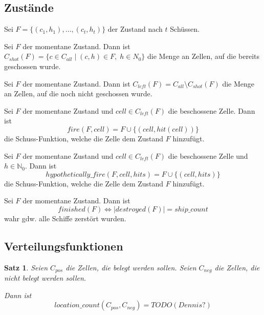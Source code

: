 \documentclass[a4paper,12pt]{llncs}
\newcommand{\N}{{\mathbb{N}}}
\numberwithin{equation}{section}
\newtheorem{satz}{Satz}
\begin{document}
\subsection{Zustände}

\begin{definition}
Sei $F=\{(c_1, h_1), \dots , (c_t, h_t)\}$ der Zustand nach $t$ Schüssen.
\end{definition}

\begin{definition}
Sei $F$ der momentane Zustand.
Dann ist $C_{shot}(F)=\{c \in C_{all} \mid (c,h) \in F, \; h \in N_0\}$ die Menge an Zellen, auf die bereits geschossen wurde.
\end{definition}

\begin{definition}
Sei $F$ der momentane Zustand.
Dann ist $C_{left}(F)=C_{all} \setminus C_{shot}(F)$ die Menge an Zellen, auf die noch nicht geschossen wurde.
\end{definition}

\begin{definition}
Sei $F$ der momentane Zustand und $cell \in C_{left}(F)$ die beschossene Zelle.
Dann ist
\[
fire(F, cell)=F \cup \{(cell,hit(cell))\}
\]
die Schuss-Funktion, welche die Zelle dem Zustand $F$ hinzufügt.
\end{definition}

\begin{definition}
Sei $F$ der momentane Zustand und $cell \in C_{left}(F)$ die beschossene Zelle und $h \in \N_0$.
Dann ist
\[
hypothetically\_fire(F, cell, hits)=F \cup \{(cell,hits)\}
\]
die Schuss-Funktion, welche die Zelle dem Zustand $F$ hinzufügt.
\end{definition}

\begin{definition}
Sei $F$ der momentane Zustand.
Dann ist
\[
finished(F) \Leftrightarrow |destroyed(F)|=ship\_count
\]
wahr gdw. alle Schiffe zerstört wurden.
\end{definition}

\subsection{Verteilungsfunktionen}

\begin{satz}
Seien $C_{pos}$ die Zellen, die belegt werden sollen. Seien $C_{neg}$ die Zellen, die nicht belegt werden sollen.

Dann ist
\[
location\_count(C_{pos}, C_{neg})=TODO (Dennis?)
\]
\end{satz}
\end{document}

